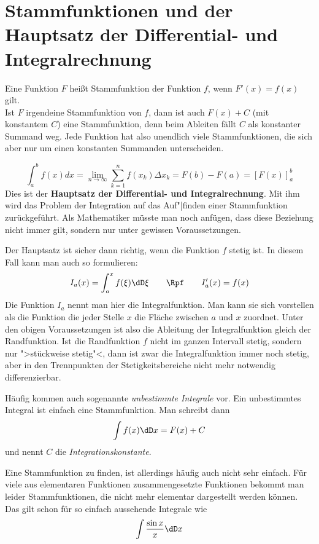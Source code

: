 \section{Stammfunktionen und der Hauptsatz der Differential- und Integralrechnung}
\begin{Definition}
  Eine Funktion $F$ heißt Stammfunktion der Funktion $f$, wenn $F'(x)=f(x)$
  gilt.\\
  Ist $F$ irgendeine Stammfunktion von $f$, dann ist auch $F(x)+C$ (mit
  konstantem $C$) eine Stammfunktion, denn beim Ableiten fällt $C$ als
  konstanter Summand weg. Jede Funktion hat also unendlich viele
  Stammfunktionen, die sich aber nur um einen konstanten Summanden
  unterscheiden.
\end{Definition}

\begin{equation}
  \int_a^b f(x)d x
  =\lim_{n\to\infty}\sum_{k=1}^n f(x_k)\Delta x_k = F(b) - F(a)
  =\left[F(x)\right]_a^b
\end{equation}
Dies ist der \textbf{Hauptsatz der Differential- und Integralrechnung}. Mit
ihm wird das Problem der Integration auf das Auf"|finden einer Stammfunktion
zurückgeführt. Als Mathematiker müsste man noch anfügen, dass diese Beziehung
nicht immer gilt, sondern nur unter gewissen Voraussetzungen.

Der Hauptsatz ist sicher dann richtig, wenn die Funktion $f$ stetig ist.
In diesem Fall kann man auch so formulieren:
\[
I_a(x)=\int_a^x f(\xi)\dD \xi \qquad\Rpf\qquad I_a'(x)=f(x)
\]
Die Funktion $I_a$ nennt man hier die Integralfunktion. Man kann sie sich
vorstellen als die Funktion die jeder Stelle $x$ die Fläche zwischen $a$ und
$x$ zuordnet. Unter den obigen Voraussetzungen ist also die Ableitung der
Integralfunktion gleich der Randfunktion. Ist die Randfunktion $f$ nicht im
ganzen Intervall stetig, sondern nur ">stückweise stetig"<, dann ist zwar die
Integralfunktion immer noch stetig, aber in den Trennpunkten der
Stetigkeitsbereiche nicht mehr notwendig differenzierbar.

Häufig kommen auch sogenannte \emph{unbestimmte Integrale} vor. Ein
unbestimmtes Integral ist einfach eine Stammfunktion. Man schreibt dann
\[
\int f(x)\dD x= F(x)+C
\]
und nennt $C$ die \emph{Integrationskonstante}.

Eine Stammfunktion zu finden, ist allerdings häufig auch nicht sehr einfach.
Für viele aus elementaren Funktionen zusammengesetzte Funktionen bekommt man
leider Stammfunktionen, die nicht mehr elementar dargestellt werden können. Das gilt
schon für so einfach aussehende Integrale wie
\[
\int \frac{\sin x}{x}\dD x
\]

